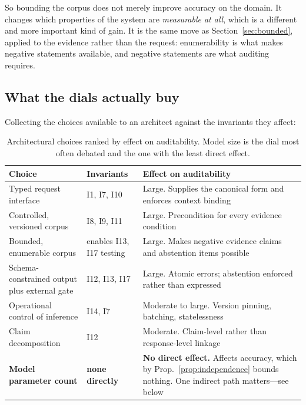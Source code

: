 \documentclass[11pt]{article}
\theoremstyle{plain}
\theoremstyle{definition}
\begin{document}
So bounding the corpus does not merely improve accuracy on the domain. It changes
which properties of the system are \emph{measurable at all}, which is a different and
more important kind of gain. It is the same move as
Section~\ref{sec:bounded}, applied to the evidence rather than the request:
enumerability is what makes negative statements available, and negative statements
are what auditing requires.

\subsection{What the dials actually buy}

Collecting the choices available to an architect against the invariants they affect:

\begin{table}[ht]
  \centering
  \small
  \begin{tabular}{@{}>{\raggedright\arraybackslash}p{4.0cm}>{\raggedright\arraybackslash}p{2.4cm}>{\raggedright\arraybackslash}p{6.4cm}@{}}
    \toprule
    Choice & Invariants & Effect on auditability \\
    \midrule
    Typed request interface
      & I1, I7, I10
      & Large. Supplies the canonical form and enforces context binding \\
    \addlinespace
    Controlled, versioned corpus
      & I8, I9, I11
      & Large. Precondition for every evidence condition \\
    \addlinespace
    Bounded, enumerable corpus
      & enables I13, I17 testing
      & Large. Makes negative evidence claims and abstention items possible \\
    \addlinespace
    Schema-constrained output plus external gate
      & I12, I13, I17
      & Large. Atomic errors; abstention enforced rather than expressed \\
    \addlinespace
    Operational control of inference
      & I14, I7
      & Moderate to large. Version pinning, batching, statelessness \\
    \addlinespace
    Claim decomposition
      & I12
      & Moderate. Claim-level rather than response-level linkage \\
    \addlinespace
    \textbf{Model parameter count}
      & \textbf{none directly}
      & \textbf{No direct effect.} Affects accuracy, which by
        Prop.~\ref{prop:independence} bounds nothing. One indirect path matters---see
        below \\
    \bottomrule
  \end{tabular}
  \caption{Architectural choices ranked by effect on auditability. Model size is the
    dial most often debated and the one with the least direct effect.}
  \label{tab:dials}
\end{table}
\end{document}
